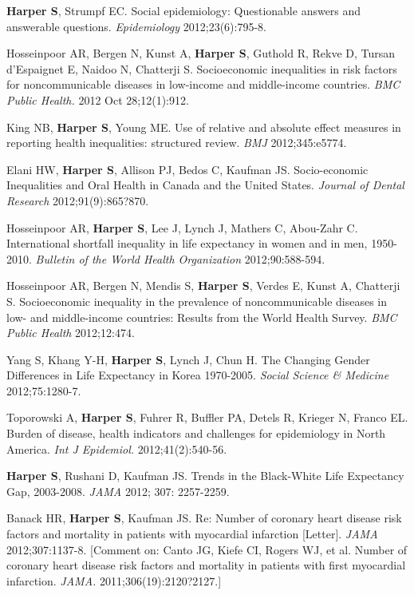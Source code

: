 \documentclass[
  letterpaper,
  DIV=11,
  numbers=noendperiod]{scrartcl}
\begin{document}
\begin{etaremune}
\item \textbf{Harper S}, Strumpf EC. Social epidemiology: Questionable answers and answerable questions. \emph{Epidemiology} 2012;23(6):795-8.
 
\item Hosseinpoor AR, Bergen N, Kunst A, \textbf{Harper S}, Guthold R, Rekve D, Tursan d'Espaignet E, Naidoo N, Chatterji S. Socioeconomic inequalities in risk factors for noncommunicable diseases in low-income and middle-income countries. \emph{BMC Public Health.} 2012 Oct 28;12(1):912.
 
\item King NB, \textbf{Harper S}, Young ME. Use of relative and absolute effect measures in reporting health inequalities: structured review. \emph{BMJ} 2012;345:e5774.
 
\item Elani HW, \textbf{Harper S}, Allison PJ, Bedos C, Kaufman JS. Socio-economic Inequalities and Oral Health in Canada and the United States. \emph{Journal of Dental Research} 2012;91(9):865?870. 
 
\item Hosseinpoor AR, \textbf{Harper S}, Lee J, Lynch J, Mathers C, Abou-Zahr C. International shortfall inequality in life expectancy in women and in men, 1950-2010. \emph{Bulletin of the World Health Organization} 2012;90:588-594.
 
\item Hosseinpoor AR, Bergen N, Mendis S, \textbf{Harper S}, Verdes E, Kunst A, Chatterji S. Socioeconomic inequality in the prevalence of noncommunicable diseases in low- and middle-income countries: Results from the World Health Survey. \emph{BMC Public Health} 2012;12:474.
 
\item Yang S, Khang Y-H, \textbf{Harper S}, Lynch J, Chun H. The Changing Gender Differences in Life Expectancy in Korea 1970-2005. \emph{Social Science \& Medicine} 2012;75:1280-7.
 
\item Toporowski A, \textbf{Harper S}, Fuhrer R, Buffler PA, Detels R, Krieger N, Franco EL. Burden of disease, health indicators and challenges for epidemiology in North America. \emph{Int J Epidemiol.} 2012;41(2):540-56.
 
\item \textbf{Harper S}, Rushani D, Kaufman JS. Trends in the Black-White Life Expectancy Gap, 2003-2008. \emph{JAMA} 2012; 307: 2257-2259.
 
\item Banack HR, \textbf{Harper S}, Kaufman JS. Re: Number of coronary heart disease risk factors and mortality in patients with myocardial infarction [Letter]. \emph{JAMA} 2012;307:1137-8. [Comment on: Canto JG, Kiefe CI, Rogers WJ, et al. Number of coronary heart disease risk factors and mortality in patients with first myocardial infarction. \emph{JAMA.} 2011;306(19):2120?2127.]
 

\end{etaremune}
\end{document}
